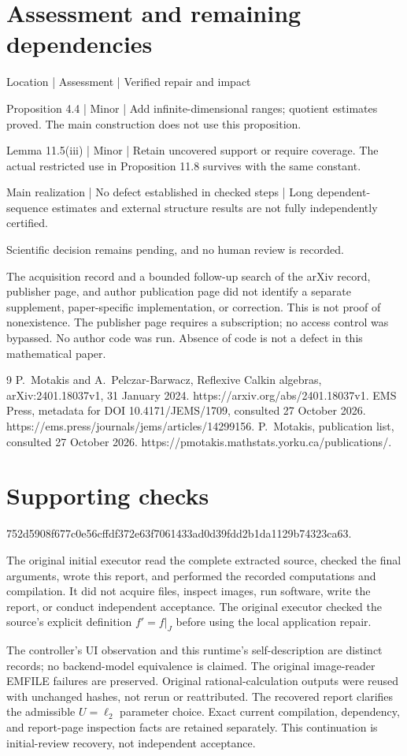 \documentclass[10pt]{article}
\begin{document}
\section*{Assessment and remaining dependencies}
Location | Assessment | Verified repair and impact\par
Proposition 4.4 | Minor | Add infinite-dimensional ranges; quotient estimates proved. The main construction does not use this proposition.\par
Lemma 11.5(iii) | Minor | Retain uncovered support or require coverage. The actual restricted use in Proposition 11.8 survives with the same constant.\par
Main realization | No defect established in checked steps | Long dependent-sequence estimates and external structure results are not fully independently certified.\par
Scientific decision remains pending, and no human review is recorded.\par
The acquisition record and a bounded follow-up search of the arXiv record, publisher page, and author publication page did not identify a separate supplement, paper-specific implementation, or correction. This is not proof of nonexistence. The publisher page requires a subscription; no access control was bypassed. No author code was run. Absence of code is not a defect in this mathematical paper.\par
9 P. Motakis and A. Pelczar-Barwacz, Reflexive Calkin algebras, arXiv:2401.18037v1, 31 January 2024. https://arxiv.org/abs/2401.18037v1. EMS Press, metadata for DOI 10.4171/JEMS/1709, consulted 27 October 2026. https://ems.press/journals/jems/articles/14299156. P. Motakis, publication list, consulted 27 October 2026. https://pmotakis.mathstats.yorku.ca/publications/.\par
\section*{Supporting checks}
752d5908f677c0e56cffdf372e63f7061433ad0d39fdd2b1da1129b74323ca63.\par
The original initial executor read the complete extracted source, checked the final arguments, wrote this report, and performed the recorded computations and compilation. It did not acquire files, inspect images, run software, write the report, or conduct independent acceptance. The original executor checked the source’s explicit definition \(f'=f|_J\) before using the local application repair.\par
The controller’s UI observation and this runtime’s self-description are distinct records; no backend-model equivalence is claimed. The original image-reader EMFILE failures are preserved. Original rational-calculation outputs were reused with unchanged hashes, not rerun or reattributed. The recovered report clarifies the admissible \(U=\ell_2\) parameter choice. Exact current compilation, dependency, and report-page inspection facts are retained separately. This continuation is initial-review recovery, not independent acceptance.\par
\end{document}
